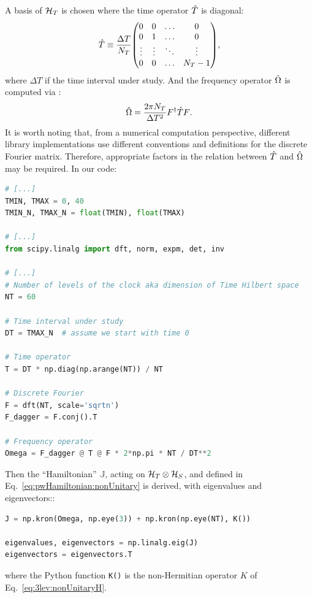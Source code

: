 A basis of $\mathcal{H}_T$ is chosen where the time operator $\hat{T}$ is diagonal:
\begin{equation}
  \op{T} \repr \frac{\Delta T}{N_T} \mqty(
                                          0       &0      &\ldots &0        \\
                                          0       &1      &\ldots &0        \\
                                          \vdots  &\vdots &\ddots &\vdots   \\
                                          0       &0      &\ldots &N_{T}-1
                                        ) \text{,}
\end{equation}
where $\Delta T$ if the time interval under study.
And the frequency operator $\hat{\Omega}$ is computed via :
\begin{equation}
  \hat{\Omega} = \frac{2\pi N_T}{\Delta{T}^2} F^{\dagger} \hat{T} F \text{.}
\end{equation}
It is worth noting that, from a numerical computation perspective,
different library implementations use different conventions and definitions
for the discrete Fourier matrix. Therefore,
appropriate factors in the relation between $\hat{T}$ and $\hat{\Omega}$
may be required.
In our code:
\begin{lstlisting}[language=Python]
# [...]
TMIN, TMAX = 0, 40
TMIN_N, TMAX_N = float(TMIN), float(TMAX)

# [...]
from scipy.linalg import dft, norm, expm, det, inv

# [...]
# Number of levels of the clock aka dimension of Time Hilbert space
NT = 60

# Time interval under study
DT = TMAX_N  # assume we start with time 0

# Time operator
T = DT * np.diag(np.arange(NT)) / NT

# Discrete Fourier
F = dft(NT, scale='sqrtn')
F_dagger = F.conj().T

# Frequency operator
Omega = F_dagger @ T @ F * 2*np.pi * NT / DT**2
\end{lstlisting}

Then the ``Hamiltonian'' ${\mathbb{J}}$, acting on $\mathcal{H}_T \otimes \mathcal{H}_S$, and defined in Eq.~\eqref{eq:pwHamiltonian:nonUnitary}
is derived, with eigenvalues and eigenvectors::
\begin{lstlisting}[language=Python]
J = np.kron(Omega, np.eye(3)) + np.kron(np.eye(NT), K())

eigenvalues, eigenvectors = np.linalg.eig(J)
eigenvectors = eigenvectors.T
\end{lstlisting}
where the Python function \verb|K()| is the non-Hermitian operator $K$ of Eq.~\eqref{eq:3lev:nonUnitaryH}.

